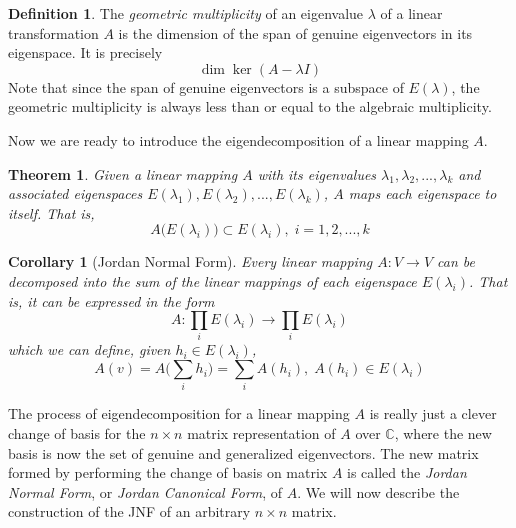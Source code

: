 \documentclass{article}
\newtheorem{theorem}{Theorem}[section]
\newtheorem{corollary}{Corollary}[theorem]
\theoremstyle{remark}
\theoremstyle{definition}
\newtheorem{definition}{Definition}[section]
\begin{document}
\begin{definition}
The \textit{geometric multiplicity} of an eigenvalue $\lambda$ of a linear transformation $A$ is the dimension of the span of genuine eigenvectors in its eigenspace. It is precisely 
\[\dim{\ker{(A - \lambda I)}}\]
Note that since the span of genuine eigenvectors is a subspace of $E(\lambda)$, the geometric multiplicity is always less than or equal to the algebraic multiplicity. 
\end{definition}

Now we are ready to introduce the eigendecomposition of a linear mapping $A$.

\begin{theorem}
Given a linear mapping $A$ with its eigenvalues $\lambda_1, \lambda_2, ..., \lambda_k$ and associated eigenspaces $E(\lambda_1), E(\lambda_2), ..., E(\lambda_k)$, $A$ maps each eigenspace to itself. That is, 
\[A\big( E(\lambda_i) \big) \subset E(\lambda_i), \; i = 1, 2, ..., k\]
\end{theorem}

\begin{corollary}[Jordan Normal Form]
Every linear mapping $A: V \longrightarrow V$ can be decomposed into the sum of the linear mappings of each eigenspace $E(\lambda_i)$. That is, it can be expressed in the form 
\[A: \prod_i E(\lambda_i) \longrightarrow \prod_i E(\lambda_i)\]
which we can define, given $h_i \in E(\lambda_i)$, 
\[A(v) = A\bigg(\sum_i h_i \bigg) = \sum_i A(h_i), \; A(h_i) \in E(\lambda_i) \]
\end{corollary}

The process of eigendecomposition for a linear mapping $A$ is really just a clever change of basis for the $n \times n$ matrix representation of $A$ over $\mathbb{C}$, where the new basis is now the set of genuine and generalized eigenvectors. The new matrix formed by performing the change of basis on matrix $A$ is called the \textit{Jordan Normal Form}, or \textit{Jordan Canonical Form}, of $A$. We will now describe the construction of the JNF of an arbitrary $n \times n$ matrix. 
\end{document}
